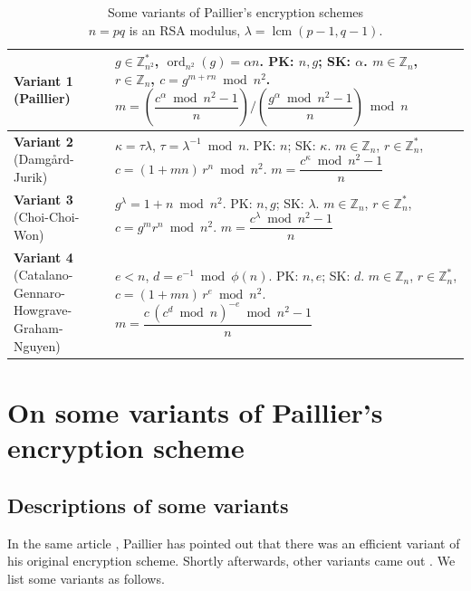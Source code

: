 \documentclass[11pt,a4paper]{article}
\theoremstyle{remark}
\newcommand{\Z}{\mathbb{Z}}
\newcommand{\ord}{\operatorname{ord}}
\newcommand{\lcm}{\operatorname{lcm}}
\begin{document}
\begin{table}[h]
\centering
\caption{Some variants of Paillier's encryption schemes\\
\small $n=pq$ is an RSA modulus, $\lambda=\lcm(p-1,q-1)$.}
\begin{tabular}{@{}l p{}@{}}
\toprule
\textbf{Variant 1} (Paillier) &
$g\in\Z_{n^2}^*$, $\ord_{n^2}(g)=\alpha n$. PK: $n,g$; SK: $\alpha$.\newline
$m\in\Z_n$, $r\in\Z_n$, $c = g^{m+rn} \bmod n^2$.\newline
$m = \left(\dfrac{c^\alpha \bmod n^2 - 1}{n}\right) \Big/ \left(\dfrac{g^\alpha \bmod n^2 - 1}{n}\right) \bmod n$\\
\midrule
\textbf{Variant 2} (Damg{\aa}rd-Jurik) &
$\kappa=\tau\lambda$, $\tau=\lambda^{-1} \bmod n$. PK: $n$; SK: $\kappa$.\newline
$m\in\Z_n$, $r\in\Z_n^*$, $c = (1+mn)\,r^n \bmod n^2$.\newline
$m = \dfrac{c^\kappa \bmod n^2 - 1}{n}$\\
\midrule
\textbf{Variant 3} (Choi-Choi-Won) &
$g^\lambda = 1+n \bmod n^2$. PK: $n,g$; SK: $\lambda$.\newline
$m\in\Z_n$, $r\in\Z_n^*$, $c = g^m r^n \bmod n^2$.\newline
$m = \dfrac{c^\lambda \bmod n^2 - 1}{n}$\\
\midrule
\textbf{Variant 4} (Catalano-Gennaro-Howgrave-Graham-Nguyen) &
$e<n$, $d = e^{-1} \bmod \phi(n)$. PK: $n,e$; SK: $d$.\newline
$m\in\Z_n$, $r\in\Z_n^*$, $c = (1+mn)\,r^e \bmod n^2$.\newline
$m = \dfrac{c\,(c^d \bmod n)^{-e} \bmod n^2 - 1}{n}$\\
\bottomrule
\end{tabular}
\end{table}

\section{On some variants of Paillier's encryption scheme}\label{sec:variants}

\subsection{Descriptions of some variants}

In the same article \cite{Pai99}, Paillier has pointed out that there was an efficient variant of his original encryption scheme. Shortly afterwards, other variants came out \cite{BCP03,CGHN01,CCW01,DJ01}. We list some variants as follows.
\end{document}
